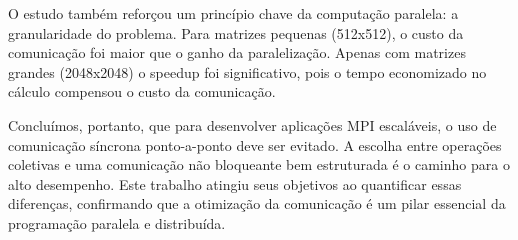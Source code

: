 \documentclass{article}
\begin{document}
O estudo também reforçou um princípio chave da computação paralela: a granularidade do problema. Para matrizes pequenas (512x512), o custo da comunicação foi maior que o ganho da paralelização. Apenas com matrizes grandes (2048x2048) o speedup foi significativo, pois o tempo economizado no cálculo compensou o custo da comunicação.

Concluímos, portanto, que para desenvolver aplicações MPI escaláveis, o uso de comunicação síncrona ponto-a-ponto deve ser evitado. A escolha entre operações coletivas e uma comunicação não bloqueante bem estruturada é o caminho para o alto desempenho. Este trabalho atingiu seus objetivos ao quantificar essas diferenças, confirmando que a otimização da comunicação é um pilar essencial da programação paralela e distribuída.
\end{document}
